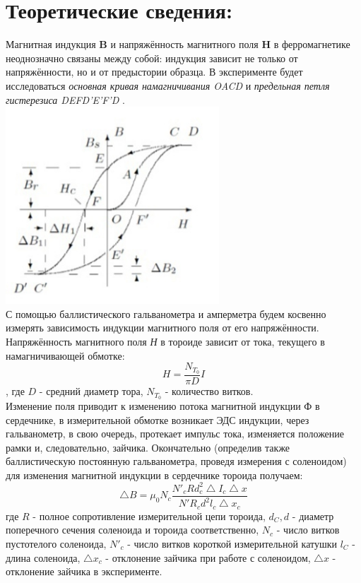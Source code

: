 \documentclass[11pt]{article}
\begin{document}
\section{Теоретические сведения:}
Магнитная индукция \textbf{B} и напряжённость магнитного поля \textbf{H} в ферромагнетике неоднозначно связаны между собой: индукция зависит не только от напряжённости, но и от предыстории образца. В эксперименте будет исследоваться \textit{основная кривая намагничивания OACD} и \textit{предельная петля гистерезиса DEFD'E'F'D} .\\
\includegraphics[width=8cm]{g1}\\
С помощью баллистического гальванометра и амперметра будем косвенно измерять зависимость индукции магнитного поля от его напряжённости. \\
Напряжённость магнитного поля \textit{Н} в тороиде зависит от тока, текущего в намагничивающей обмотке:
    $$H = \frac{N_{T_0}}{\pi D}I$$,
где $D$ - средний диаметр тора, $N_{T_0}$ - количество витков.\\
Изменение поля приводит к изменению потока магнитной индукции Ф в сердечнике, в измерительной обмотке возникает ЭДС индукции, через гальванометр, в свою очередь, протекает импульс тока, изменяется положение рамки и, следовательно, зайчика. Окончательно (определив также баллистическую постоянную гальванометра, проведя измерения с соленоидом) для изменения магнитной индукции в сердечнике тороида получаем:
$$\bigtriangleup B = \mu_0 N_c \frac{N'_c R d_c^2 \bigtriangleup I_c \bigtriangleup x}{N' R_c d^2 l_c \bigtriangleup x_c}$$
где $R$ - полное сопротивление измерительной цепи тороида, $d_C, d$ - диаметр поперечного сечения соленоида и тороида соответственно,  $N_c$ - число витков пустотелого соленоида, $N'_c$ - число витков короткой измерительной катушки $l_C$ - длина соленоида, $\triangle x_c$ - отклонение зайчика при работе с соленоидом, $\triangle x$ - отклонение зайчика в эксперименте.
\end{document}
